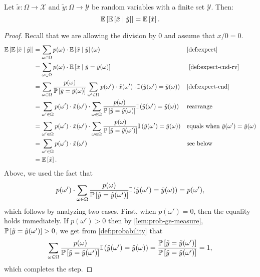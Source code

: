 \begin{theorem} \label{thm:total-expectation}
Let $\tilde{x} \colon \Omega \to \mathcal{X}$ and $\tilde{y} \colon \Omega \to \mathcal{Y}$ be random variables with a finite set $\mathcal{Y}$. Then:
\[
\mathbb{E}\left[\mathbb{E}\left[\tilde{x} \mid  \tilde{y}\right]\right] = \mathbb{E} \left[ \tilde{x} \right].
\]
\end{theorem}
\begin{proof}
Recall that we are allowing the division by 0 and assume that $x / 0 = 0$.
\begin{align*} 
  \E\left[\E\left[\tilde{x} \mid  \tilde{y}\right]\right]
  &= \sum_{\omega \in \Omega }  p (\omega) \cdot  \E \left[ \tilde{x} \mid  \tilde{y} \right](\omega) && \text{\cref{def:expect}}\\
  &= \sum_{\omega \in \Omega }  p (\omega) \cdot  \E \left[ \tilde{x} \mid  \tilde{y}  = \tilde{y}(\omega) \right] && \text{~\cref{def:expect-cnd-rv}}\\
  &= \sum_{\omega \in \Omega }  \frac{p(\omega)}{\PP \left[ \tilde{y}= \tilde{y}(\omega)\right]} \sum_{\omega'\in \Omega } p(\omega') \cdot \tilde{x}(\omega') \cdot  \I\left( \tilde{y}(\omega') = \tilde{y}(\omega) \right)   && \text{\cref{def:expect-cnd}} \\
  &=  \sum_{\omega'\in \Omega } p(\omega') \cdot \tilde{x}(\omega') \cdot \sum_{\omega \in \Omega }  \frac{p(\omega)}{\PP \left[ \tilde{y}= \tilde{y}(\omega)\right]} \I\left( \tilde{y}(\omega') = \tilde{y}(\omega) \right)  && \text{rearrange} \\
  &=  \sum_{\omega'\in \Omega } p(\omega') \cdot \tilde{x}(\omega') \cdot \sum_{\omega \in \Omega }  \frac{p(\omega)}{\PP \left[ \tilde{y} = \tilde{y}(\omega')\right]} \I\left( \tilde{y}(\omega') = \tilde{y}(\omega) \right)  && \text{equals when } \tilde{y}(\omega') = \tilde{y}(\omega) \\
  &=  \sum_{\omega'\in \Omega } p(\omega') \cdot \tilde{x}(\omega')    && \text{see below}  \\
  &= \E \left[ \tilde{x} \right].
\end{align*}
Above, we used the fact that
\[
  p(\omega') \cdot \sum_{\omega \in \Omega }  \frac{p(\omega)}{\mathbb{P} \left[ \tilde{y} = \tilde{y}(\omega')\right]} \mathbb{I}\left( \tilde{y}(\omega') = \tilde{y}(\omega) \right) =  p(\omega'),  
\]
which follows by analyzing two cases. First, when $p(\omega') = 0$, then the equality holds immediately. If $p(\omega') > 0$ then by \cref{lem:prob-ge-measure}, $\mathbb{P} \left[ \tilde{y} = \tilde{y}(\omega')\right] > 0$, we get from \cref{def:probability} that
\[
  \sum_{\omega \in \Omega } \frac{p(\omega)}{\mathbb{P} \left[ \tilde{y} = \tilde{y}(\omega')\right]} \mathbb{I}\left( \tilde{y}(\omega') = \tilde{y}(\omega) \right) 
    =
    \frac{\mathbb{P} \left[ \tilde{y} = \tilde{y}(\omega')\right]}{\mathbb{P} \left[ \tilde{y} = \tilde{y}(\omega')\right]}
    = 1,
  \]
  which completes the step.
\end{proof}
